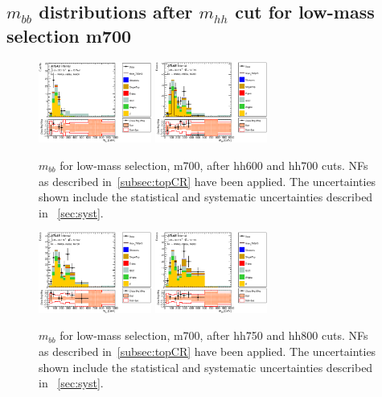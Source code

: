 \subsection{$m_{bb}$ distributions after $m_{hh}$ cut for low-mass selection m700} 
\begin{figure}[!h]
\begin{center}
\includegraphics*[width=0.33\textwidth] {figures/ControlPlots/reOpt700_bbMass_allMhh/C_reOpt700_mww_bbpt210_wwpt250_hh600_bbMass_regionA_met25d020}
\includegraphics*[width=0.33\textwidth] {figures/ControlPlots/reOpt700_bbMass_allMhh/C_reOpt700_mww_bbpt210_wwpt250_hh700c_bbMass_regionA_met25d020}
\caption[$m_{bb}$ for low-mass selection, m700, after hh600 and hh700 cuts.]{$m_{bb}$ for low-mass selection, m700, after hh600 and hh700 cuts. \ttbar NFs as described in~\ref{subsec:topCR} have been applied. The uncertainties shown include the statistical and systematic uncertainties described in ~\ref{sec:syst}.}
\end{center}
\end{figure}
\begin{figure}[!h]
\begin{center}
\includegraphics*[width=0.33\textwidth] {figures/ControlPlots/reOpt700_bbMass_allMhh/C_reOpt700_mww_bbpt210_wwpt250_hh750c_bbMass_regionA_met25d020}
\includegraphics*[width=0.33\textwidth] {figures/ControlPlots/reOpt700_bbMass_allMhh/C_reOpt700_mww_bbpt210_wwpt250_hh800c_bbMass_regionA_met25d020}
\caption[$m_{bb}$ for low-mass selection, m700, after hh750 and hh800 cuts.]{$m_{bb}$ for low-mass selection, m700, after hh750 and hh800 cuts. \ttbar NFs as described in~\ref{subsec:topCR} have been applied. The uncertainties shown include the statistical and systematic uncertainties described in ~\ref{sec:syst}.}
\end{center}
\end{figure}


